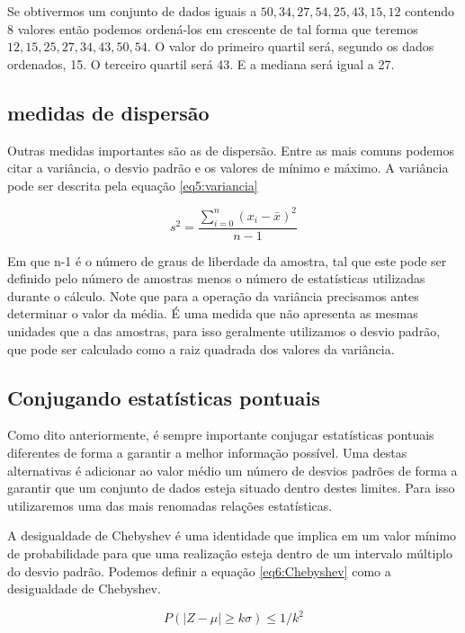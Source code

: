 Se obtivermos um conjunto de dados iguais a ${50,34,27,54,25,43,15,12}$ contendo 8 valores então podemos ordená-los em crescente de tal forma que teremos ${12,15,25,27,34,43,50,54}$. O valor do primeiro quartil será, segundo os dados ordenados, 15. O terceiro quartil será 43. E a mediana será igual a 27. 

\subsection{medidas de dispersão}

Outras medidas importantes são as de dispersão. Entre as mais comuns podemos citar a variância, o desvio padrão e os valores de mínimo e máximo. A variância pode ser descrita pela equação \eqref{eq5:variancia}

\begin{equation}\label{eq5:variancia}
  s^2 = \frac{\sum_{i = 0}^{n} \left( x_i - \bar{x} \right)^2}{n-1}
\end{equation}

Em que n-1 é o número de graus de liberdade da amostra, tal que este pode ser definido pelo número de amostras menos o número de estatísticas utilizadas durante o cálculo. Note que para a operação da variância precisamos antes determinar o valor da média. É uma medida que não apresenta as mesmas unidades que a das amostras, para isso geralmente utilizamos o desvio padrão, que pode ser calculado como a raiz quadrada dos valores da variância. 

\subsection{Conjugando estatísticas pontuais}

Como dito anteriormente, é sempre importante conjugar estatísticas pontuais diferentes de forma a garantir a melhor informação possível. Uma destas alternativas é adicionar ao valor médio um número de desvios padrões de forma a garantir que um conjunto de dados esteja situado dentro destes limites. Para isso utilizaremos uma das mais renomadas relações estatísticas.

A desigualdade de Chebyshev é uma identidade que implica em um valor mínimo de probabilidade para que uma realização esteja dentro de um intervalo múltiplo do desvio padrão. Podemos definir a equação \eqref{eq6:Chebyshev} como a desigualdade de Chebyshev.

\begin{equation}\label{eq6:Chebyshev}
P\left(|Z-\mu| \geq k\sigma\right)\leq1/k^2
\end{equation}


